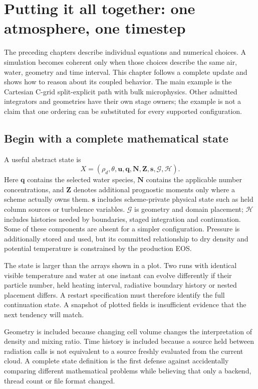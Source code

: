 \chapter{Putting it all together: one atmosphere, one timestep}\label{putting-it-together}

The preceding chapters describe individual equations and numerical choices.
A simulation becomes coherent only when those choices describe the same air,
water, geometry and time interval. This chapter follows a complete update and
shows how to reason about its coupled behavior. The main example is the
Cartesian C-grid split-explicit path with bulk microphysics. Other admitted
integrators and geometries have their own stage owners; the example is not a
claim that one ordering can be substituted for every supported configuration.

\section{Begin with a complete mathematical state}

A useful abstract state is
\[
 X=(\rho_d,\theta,\boldsymbol u,\boldsymbol q,\boldsymbol N,
       \boldsymbol Z,\boldsymbol s,\mathcal G,\mathcal H).
\]
Here $\boldsymbol q$ contains the selected water species, $\boldsymbol N$
contains the applicable number concentrations, and $\boldsymbol Z$ denotes
additional prognostic moments only where a scheme actually owns them.
$\boldsymbol s$ includes scheme-private physical state such as held column
sources or turbulence variables. $\mathcal G$ is geometry and domain placement;
$\mathcal H$ includes histories needed by boundaries, staged integration and
continuation. Some of these components are absent for a simpler configuration.
Pressure is additionally stored and used, but its committed relationship to
dry density and potential temperature is constrained by the production EOS.

The state is larger than the arrays shown in a plot. Two runs with identical
visible temperature and water at one instant can evolve differently if their
particle number, held heating interval, radiative boundary history or nested
placement differs. A restart specification must therefore identify the full
continuation state. A snapshot of plotted fields is insufficient evidence that
the next tendency will match.

Geometry is included because changing cell volume changes the interpretation
of density and mixing ratio. Time history is included because a source held
between radiation calls is not equivalent to a source freshly evaluated from
the current cloud. A complete state definition is the first defense against
accidentally comparing different mathematical problems while believing that
only a backend, thread count or file format changed.

